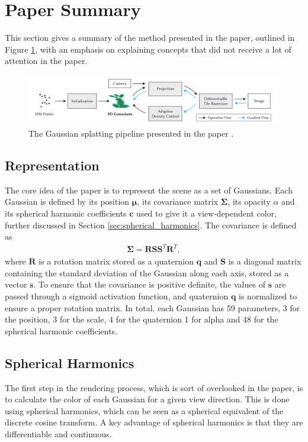 

\section{Paper Summary}
This section gives a summary of the method presented in the paper, outlined in Figure \ref{fig:pipeline},
with an emphasis on explaining concepts that did not receive a lot of attention in the paper.

\begin{figure}
    \centering
    \includegraphics[width=\textwidth]{images/pipeline.png}
    \caption{The Gaussian splatting pipeline presented in the paper \cite[Fig. 2]{kerbl3DGaussianSplatting2023}.}
    \label{fig:pipeline}
\end{figure}


\subsection{Representation}
The core idea of the paper is to represent the scene as a set of Gaussians.
Each Gaussian is defined by its position $\bm{\mu}$, its covariance matrix $\bm{\Sigma}$, its opacity $\alpha$ and its spherical harmonic coefficients $\bm{c}$ used to give it a view-dependent color, further discussed in Section \ref{sec:spherical_harmonics}.
The covariance is defined as
\begin{align}
    \bm{\Sigma} = \bm{R} \bm{S} \bm{S}^T \bm{R}^T,
\end{align}
where $\bm{R}$ is a rotation matrix stored as a quaternion $\bm{q}$ and $\bm{S}$ is a diagonal matrix containing the standard deviation of the Gaussian along each axis, stored as a vector $\bm{s}$.
To ensure that the covariance is positive definite, the values of $\bm{s}$ are passed through a sigmoid activation function, and quaternion $\bm{q}$ is normalized to ensure a proper rotation matrix.
In total, each Gaussian has 59 parameters, 3 for the position, 3 for the scale, 4 for the quaternion 1 for alpha and 48 for the spherical harmonic coefficients.

\subsection{Spherical Harmonics}
The first step in the rendering process, which is sort of overlooked in the paper, is to calculate the color of each Gaussian for a given view direction.
This is done using spherical harmonics, which can be seen as a spherical equivalent of the discrete cosine transform.
A key advantage of spherical harmonics is that they are differentiable and continuous.



